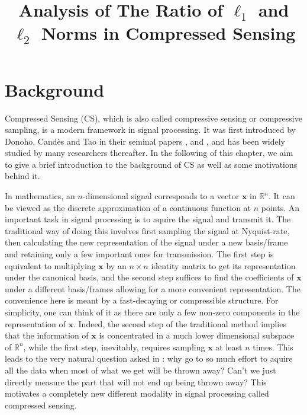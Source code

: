 \documentclass[11pt]{article}
\numberwithin{equation}{section}
\theoremstyle{plain}
\theoremstyle{definition}
\def\R{{\mathbb R}}
\def\R{{\mathbb R}}
\def\x{{\mathbf x}}
\begin{document}
\title{Analysis of The Ratio of $\ell_1$ and $\ell_2$ Norms in Compressed Sensing}

\maketitle



\section{Background}

Compressed Sensing (CS), which is also called compressive sensing or compressive sampling, is a modern framework in signal processing. It was first introduced by Donoho, Cand\`es and Tao in their seminal papers  \cite{donoho2006compressed}, \cite{emmanuel2004robust} and \cite{candes2004near}, and has been widely studied by many researchers thereafter. In the following of this chapter, we aim to give a brief introduction to the background of CS as well as some motivations behind it. 

In mathematics, an $n$-dimensional signal corresponds to a vector $\x$ in $\R^n$. It can be viewed as the discrete approximation of a continuous function at $n$ points. An important task in signal processing is to aquire the signal and transmit it. The traditional way of doing this involves first sampling the signal at Nyquist-rate, then calculating the new representation of the signal under a new basis/frame and retaining only a few important ones for transmission. The first step is equivalent to multiplying $\x$ by an $n\times n$ identity matrix to get its representation under the canonical basis, and the second step suffices to find the coefficients of $\x$ under a different basis/frames allowing for a more convenient representation. The convenience here is meant by a fast-decaying or compressible structure. For simplicity, one can think of it as there are only a few non-zero components in the representation of $\x$. Indeed, the second step of the traditional method implies that the information of $\x$ is concentrated in a much lower dimensional subspace of $\R^n$, while the first step, inevitably, requires sampling $\x$ at least $n$ times. This leads to the very natural question asked in \cite{donoho2006compressed}: why go to so much effort to aquire all the data when most of what we get will be thrown away? Can't we just directly measure the part that will not end up being thrown away? This motivates a completely new different modality in signal processing called compressed sensing.
\end{document}
